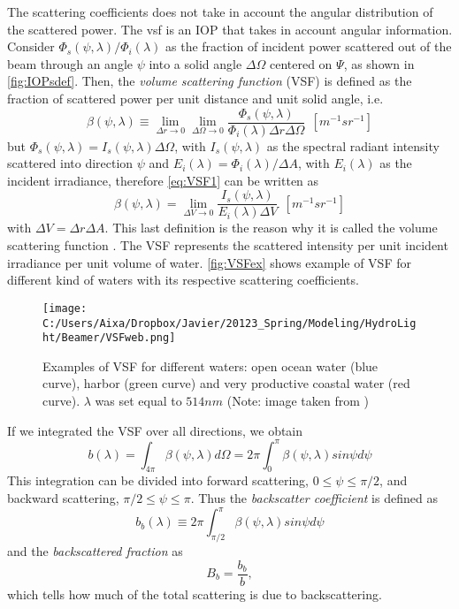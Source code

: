 The scattering coefficients does not take in account the angular distribution of the scattered power. The \gls{vsf} is an IOP that takes in account angular information. Consider $\Phi_s(\psi,\lambda)/\Phi_i(\lambda)$ as the fraction of incident power scattered out of the beam through an angle $\psi$ into a solid angle $\Delta\Omega$ centered on $\Psi$, as shown in \autoref{fig:IOPsdef}. Then, the {\it volume scattering function} (VSF)  is defined as the fraction of scattered power per unit distance and unit solid angle, i.e.
\begin{equation}\label{eq:VSF1}
  \beta(\psi,\lambda)\equiv \lim_{\Delta r\to 0} \lim_{\Delta \Omega\to 0}  \frac{\Phi_s(\psi,\lambda)}{\Phi_i(\lambda)\Delta r\Delta \Omega}~~\left[m^{-1}sr^{-1} \right]
\end{equation}
but $\Phi_s(\psi,\lambda)=I_s(\psi,\lambda)\Delta \Omega$, with $I_s(\psi,\lambda)$ as the spectral radiant intensity scattered into direction $\psi$ and $E_i(\lambda)=\Phi_i(\lambda)/\Delta A$, with $E_i(\lambda)$ as the incident irradiance, therefore \autoref{eq:VSF1} can be written as
\begin{equation} 
  \beta(\psi,\lambda)= \lim_{\Delta V\to 0} \frac{I_s(\psi,\lambda)}{E_i(\lambda)\Delta V}~~\left[m^{-1}sr^{-1} \right]
\end{equation}
with $\Delta V=\Delta r\Delta A$. This last definition is the reason why it is called the volume scattering function \cite{Mobley:2001}. The VSF represents the scattered intensity per unit incident irradiance per unit volume of water. \autoref{fig:VSFex} shows example of VSF for different kind of waters with its respective scattering coefficients.

\begin{figure}[htb]
\centering
      \texttt{[image: C:/Users/Aixa/Dropbox/Javier/20123\_Spring/Modeling/HydroLight/Beamer/VSFweb.png]}
      \caption{Examples of VSF for different waters: open ocean water (blue curve), harbor (green curve) and very productive coastal water (red curve). $\lambda$ was set equal to $514nm$ (Note: image taken from \cite{Mobley:2001})}
      \label{fig:VSFex}
\end{figure}

If we integrated the VSF over all directions, we obtain
\begin{equation}
  b(\lambda)=\int_{4\pi} \beta(\psi,\lambda)d\Omega=2\pi\int_0^\pi \beta(\psi,\lambda)sin\psi d\psi
\end{equation}
This integration can be divided into forward scattering, $0\leq\psi\leq\pi/2$, and backward scattering, $\pi/2\leq\psi\leq\pi$. Thus the {\it backscatter coefficient}  is defined as
\begin{equation}
  b_b(\lambda)\equiv 2\pi\int_{\pi/2}^\pi \beta(\psi,\lambda)sin\psi d\psi
\end{equation}
and the {\it backscattered fraction}  as 
\begin{equation}
  B_b=\frac{b_b}{b},
\end{equation}
which tells how much of the total scattering is due to backscattering.

